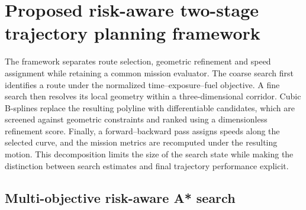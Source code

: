 \section{Proposed risk-aware two-stage trajectory planning framework}
\label{sec:method}

The framework separates route selection, geometric refinement and speed
assignment while retaining a common mission evaluator. The coarse search
first identifies a route under the normalized time--exposure--fuel objective.
A fine search then resolves its local geometry within a three-dimensional
corridor. Cubic B-splines replace the resulting polyline with differentiable
candidates, which are screened against geometric constraints and ranked
using a dimensionless refinement score. Finally, a forward--backward pass
assigns speeds along the selected curve, and the mission metrics are
recomputed under the resulting motion. This decomposition limits the size
of the search state while making the distinction between search estimates
and final trajectory performance explicit.


\subsection{Multi-objective risk-aware A* search}
\label{sec:astar}

